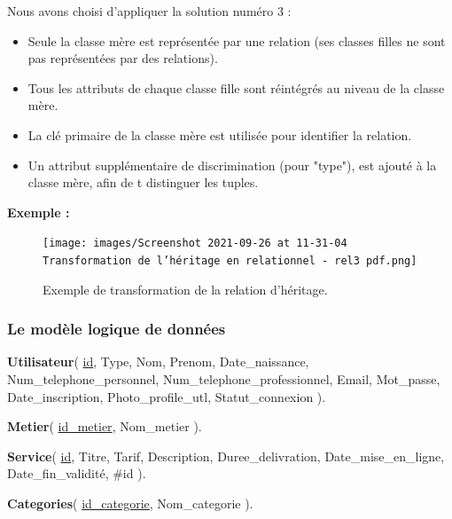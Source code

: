 \documentclass[french]{report}
\begin{document}
\begin{description}
                Nous avons choisi d'appliquer la solution numéro 3 :
                \begin{itemize}
                    \item Seule la classe mère est représentée par une relation
		    (ses classes filles ne sont pas représentées par des relations).\cite{scenari-community}
                    \item Tous les attributs de chaque classe fille sont réintégrés au niveau de la classe mère.\cite{scenari-community}
                    \item La clé primaire de la classe mère est utilisée pour identifier la relation.\cite{scenari-community}
                    \item Un attribut supplémentaire de discrimination   (pour "type"), est ajouté à la classe mère, afin de t distinguer les tuples.\cite{scenari-community}
                \end{itemize}  
                
                \textbf{Exemple : }
                \begin{figure}[H]
                    \centering
                    \texttt{[image: images/Screenshot 2021-09-26 at 11-31-04 Transformation de l'héritage en relationnel - rel3 pdf.png]}
                    \caption{Exemple de transformation de la relation d'héritage.}
                    \label{exemple régle 4}
                \end{figure}
            \end{description}
            
            \subsubsection{Le modèle logique de données}
           
           \textbf{Utilisateur}( \underline{id}, Type, Nom, Prenom, Date\_naissance,
	   Num\_telephone\_personnel, Num\_telephone\_professionnel, Email, Mot\_passe,
	   Date\_inscription, Photo\_profile\_utl, Statut\_connexion ).
           
           \textbf{Metier}( \underline{id\_metier}, Nom\_metier ).
           
           \textbf{Service}( \underline{id}, Titre, Tarif, Description, Duree\_delivration,
	   Date\_mise\_en\_ligne, Date\_fin\_validité, \#id ).
           
           \textbf{Categories}( \underline{id\_categorie}, Nom\_categorie ).
           
\end{document}
